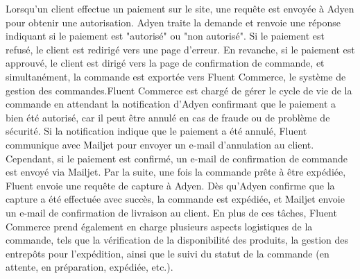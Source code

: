 Lorsqu'un client effectue un paiement sur le site, une requête est envoyée à Adyen pour obtenir une autorisation. Adyen traite la demande et renvoie une réponse indiquant si le paiement est "autorisé" ou "non autorisé". Si le paiement est refusé, le client est redirigé vers une page d'erreur. En revanche, si le paiement est approuvé, le client est dirigé vers la page de confirmation de commande, et simultanément, la commande est exportée vers Fluent Commerce, le système de gestion des commandes.Fluent Commerce est chargé de gérer le cycle de vie de la commande en attendant la notification d'Adyen confirmant que le paiement a bien été autorisé, car il peut être annulé en cas de fraude ou de problème de sécurité. Si la notification indique que le paiement a été annulé, Fluent communique avec Mailjet pour envoyer un e-mail d'annulation au client. Cependant, si le paiement est confirmé, un e-mail de confirmation de commande est envoyé via Mailjet. Par la suite, une fois la commande prête à être expédiée, Fluent envoie une requête de capture à Adyen. Dès qu'Adyen confirme que la capture a été effectuée avec succès, la commande est expédiée, et Mailjet envoie un e-mail de confirmation de livraison au client. En plus de ces tâches, Fluent Commerce prend également en charge plusieurs aspects logistiques de la commande, tels que la vérification de la disponibilité des produits, la gestion des entrepôts pour l’expédition, ainsi que le suivi du statut de la commande (en attente, en préparation, expédiée, etc.).

